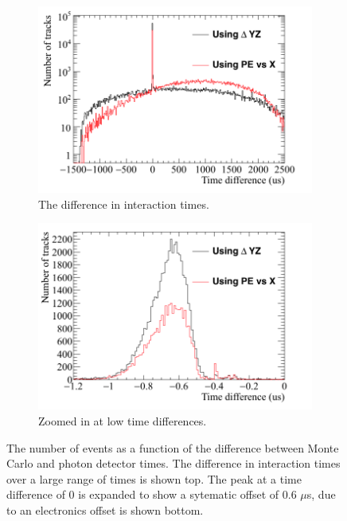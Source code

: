 \begin{figure}[h!]
  \centering
  \begin{subfigure}{0.6\textwidth}
    \centering
    \includegraphics[width=\textwidth]{Pred_Reco_T_Full}
    \caption{The difference in interaction times.}
  \end{subfigure}
  \begin{subfigure}{0.6\textwidth}
    \centering
    \includegraphics[width=\textwidth]{Pred_Reco_T_Zoom}
    \caption{Zoomed in at low time differences.}
  \end{subfigure}
  \caption[The number of events as a function of the difference between Monte Carlo and photon detector times]
          {The number of events as a function of the difference between Monte Carlo and photon detector times. The difference in interaction times over a large range of times is shown top. The peak at a time difference of 0 is expanded to show a sytematic offset of 0.6 $\mu$s, due to an electronics offset is shown bottom.}
          \label{fig:PD_MCPDDiff}
\end{figure}

